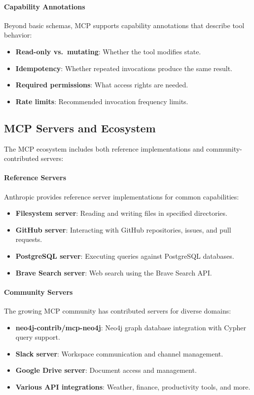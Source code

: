 \paragraph{Capability Annotations}

Beyond basic schemas, MCP supports capability annotations that describe tool behavior:

\begin{itemize}
    \item \textbf{Read-only vs.\ mutating}: Whether the tool modifies state.
    \item \textbf{Idempotency}: Whether repeated invocations produce the same result.
    \item \textbf{Required permissions}: What access rights are needed.
    \item \textbf{Rate limits}: Recommended invocation frequency limits.
\end{itemize}

\subsection{MCP Servers and Ecosystem}

The MCP ecosystem includes both reference implementations and community-contributed servers:

\paragraph{Reference Servers}

Anthropic provides reference server implementations for common capabilities:
\begin{itemize}
    \item \textbf{Filesystem server}: Reading and writing files in specified directories.
    \item \textbf{GitHub server}: Interacting with GitHub repositories, issues, and pull requests.
    \item \textbf{PostgreSQL server}: Executing queries against PostgreSQL databases.
    \item \textbf{Brave Search server}: Web search using the Brave Search API.
\end{itemize}

\paragraph{Community Servers}

The growing MCP community has contributed servers for diverse domains:
\begin{itemize}
    \item \textbf{neo4j-contrib/mcp-neo4j}: Neo4j graph database integration with Cypher query support.
    \item \textbf{Slack server}: Workspace communication and channel management.
    \item \textbf{Google Drive server}: Document access and management.
    \item \textbf{Various API integrations}: Weather, finance, productivity tools, and more.
\end{itemize}

